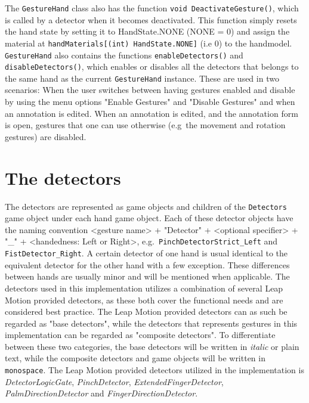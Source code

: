 The \texttt{GestureHand} class also has the function \texttt{void DeactivateGesture()}, which is called by a detector when it becomes deactivated. 
This function simply resets the hand state by setting it to HandState.NONE (NONE = 0) and assign the material at \texttt{handMaterials[(int) HandState.NONE]} (i.e 0) to the
handmodel. \texttt{GestureHand} also contains the functions \texttt{enableDetectors()} and \texttt{disableDetectors()}, which 
enables or disables all the detectors that belongs to the same hand as the current \texttt{GestureHand} instance. These are used in two scenarios:
When the user switches between having gestures enabled and disable by using the menu options "Enable Gestures" and "Disable Gestures" and when an annotation 
is edited. When an annotation is edited, and the annotation form is open, gestures that one can use otherwise (e.g~the movement and rotation gestures) are disabled.

 
\section{The detectors}
The detectors are represented as game objects and children of the \texttt{Detectors} game object under each hand game object. 
Each of these detector objects have the naming convention <gesture name> + "Detector" + <optional specifier> + "\_" + <handedness: Left or Right>, 
e.g.~\texttt{PinchDetectorStrict\_Left} and \texttt{FistDetector\_Right}. A certain detector of one hand is usual identical to the equivalent detector for the 
other hand with a few exception. These differences between hands are usually minor and will be mentioned when applicable. The detectors used in this implementation
utilizes a combination of several Leap Motion provided detectors, as these both cover the functional needs and are considered best practice. 
The Leap Motion provided detectors can as such be regarded as "base detectors", while the detectors that represents gestures in this implementation
can be regarded as "composite detectors". To differentiate between these two categories, the base detectors will be written in \textit{italic} or plain text, while
the composite detectors and game objects will be written in \texttt{monospace}.
The Leap Motion provided detectors utilized in the implementation is \textit{DetectorLogicGate}, \textit{PinchDetector}, \textit{ExtendedFingerDetector}, 
\textit{PalmDirectionDetector} and \textit{FingerDirectionDetector}.

